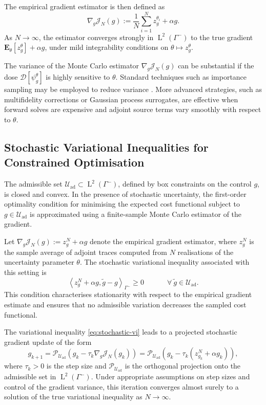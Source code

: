 \documentclass{amsart}
\theoremstyle{plain}
\newcommand{\leb}{\text{Leb}}
\newcommand{\LL}{\ensuremath{\operatorname L}\xspace}
\renewcommand{\leb}[1]{\ensuremath{\LL^{#1}}}
\newcommand{\ltwop}[2]{\ensuremath{\!\left\langle{#1,#2}\right\rangle}}
\newcommand{\Forall}{\:\forall\:}
\newcommand{\Foreach}{\quad\Forall}
\begin{document}
The empirical gradient estimator is then defined as
\begin{equation}
  \nabla_g \mathcal{J}_N(g) := \frac{1}{N} \sum_{i=1}^N z_g^{\theta_i} + \alpha g.
\end{equation}
As $N \to \infty$, the estimator converges strongly in
$\leb2(\Gamma^-)$ to the true gradient $\mathbf{E}_\theta[z_g^\theta]
+ \alpha g$, under mild integrability conditions on $\theta \mapsto
z_g^\theta$.

The variance of the Monte Carlo estimator $\nabla_g \mathcal{J}_N(g)$
can be substantial if the dose $\mathcal{D}[\psi_g^\theta]$ is highly
sensitive to $\theta$. Standard techniques such as importance sampling
may be employed to reduce variance \cite{hoogenboom2008zero}. More
advanced strategies, such as multifidelity corrections or Gaussian
process surrogates, are effective when forward solves are expensive
and adjoint source terms vary smoothly with respect to $\theta$.  

\subsection{Stochastic Variational Inequalities for Constrained Optimisation}
\label{subsec:stochastic-vi}

The admissible set $\mathcal{U}_{\mathrm{ad}} \subset
\leb2(\Gamma^-)$, defined by box constraints on the control $g$, is
closed and convex. In the presence of stochastic uncertainty, the
first-order optimality condition for minimising the expected cost
functional subject to $g \in \mathcal{U}_{\mathrm{ad}}$ is
approximated using a finite-sample Monte Carlo estimator of the
gradient.

Let $\nabla_g \mathcal{J}_N(g) := z_g^N + \alpha g$ denote the
empirical gradient estimator, where $z_g^N$ is the sample average of
adjoint traces computed from $N$ realisations of the uncertainty
parameter $\theta$. The stochastic variational inequality
associated with this setting is
\begin{equation}
  \label{eq:stochastic-vi}
  \ltwop{z_g^N + \alpha g}{\tilde{g} - g}_{\Gamma^-} \ge 0
  \qquad \Foreach \tilde{g} \in \mathcal{U}_{\mathrm{ad}}.
\end{equation}
This condition characterises stationarity with respect to the
empirical gradient estimate and ensures that no admissible variation
decreases the sampled cost functional.

The variational inequality \eqref{eq:stochastic-vi} leads to a
projected stochastic gradient update of the form
\begin{equation}
  g_{k+1} = \mathcal{P}_{\mathcal{U}_{\mathrm{ad}}} \left( g_k - \tau_k \nabla_g \mathcal{J}_N(g_k) \right)
  = \mathcal{P}_{\mathcal{U}_{\mathrm{ad}}} \left( g_k - \tau_k (z_{g_k}^N + \alpha g_k) \right),
\end{equation}
where $\tau_k > 0$ is the step size and
$\mathcal{P}_{\mathcal{U}_{\mathrm{ad}}}$ is the orthogonal projection
onto the admissible set in $\leb2(\Gamma^-)$. Under appropriate
assumptions on step sizes and control of the gradient variance, this
iteration converges almost surely to a solution of the true
variational inequality as $N \to \infty$.
\end{document}
